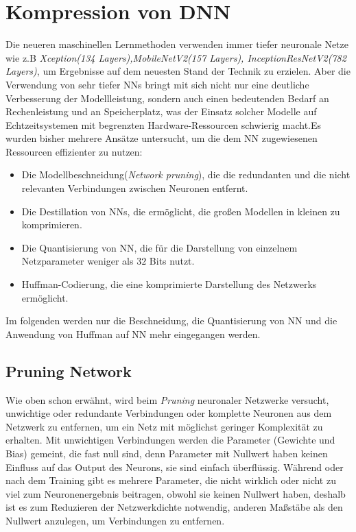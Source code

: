 \documentclass[12pt,a4paper]{scrartcl}
\numberwithin{equation}{section}
\begin{document}
\section{Kompression von \ac{DNN}}
Die neueren maschinellen Lernmethoden verwenden immer tiefer neuronale Netze wie z.B \textit{Xception(134 Layers),MobileNetV2(157 Layers), InceptionResNetV2(782 Layers)}, um Ergebnisse auf dem neuesten Stand der Technik zu erzielen. Aber die Verwendung von sehr tiefer \acsp{NN} bringt mit sich nicht nur eine deutliche Verbesserung der Modellleistung, sondern auch einen bedeutenden Bedarf an Rechenleistung und an Speicherplatz, was der Einsatz solcher Modelle auf Echtzeitsystemen mit begrenzten Hardware-Ressourcen schwierig macht.Es wurden bisher mehrere Ansätze untersucht, um die dem \ac{NN} zugewiesenen Ressourcen effizienter zu nutzen:
\begin{itemize}
	\item Die Modellbeschneidung(\textit{Network pruning}), die die redundanten und  die nicht relevanten Verbindungen zwischen Neuronen entfernt.
	 \item Die Destillation von \acsp{NN}, die ermöglicht, die großen Modellen in kleinen  zu komprimieren. 	
 \item Die Quantisierung von \ac{NN}, die für die Darstellung von einzelnem Netzparameter weniger als $ 32 $ Bits nutzt.
 \item  Huffman-Codierung, die eine komprimierte Darstellung des Netzwerks ermöglicht.
\end{itemize} 
Im folgenden werden nur die Beschneidung, die Quantisierung von \ac{NN} und die Anwendung von Huffman auf \ac{NN} mehr eingegangen werden.

\subsection{Pruning Network}
Wie oben schon erwähnt, wird beim \textit{Pruning} neuronaler Netzwerke versucht, unwichtige oder redundante Verbindungen oder komplette Neuronen aus dem Netzwerk zu entfernen, um ein Netz mit möglichst geringer Komplexität zu erhalten. Mit unwichtigen Verbindungen werden die Parameter (Gewichte und Bias) gemeint, die fast null sind, denn Parameter mit Nullwert haben keinen Einfluss auf das Output des Neurons, sie sind einfach überflüssig. Während oder nach dem Training gibt es mehrere Parameter, die nicht wirklich oder nicht zu viel zum Neuronenergebnis beitragen, obwohl sie keinen Nullwert haben, deshalb ist es zum Reduzieren der Netzwerkdichte notwendig, anderen Maßstäbe als den Nullwert anzulegen, um Verbindungen zu entfernen.
\end{document}
